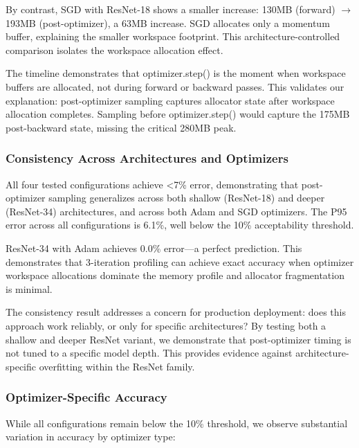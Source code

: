 By contrast, SGD with ResNet-18 shows a smaller increase: 130MB (forward) $\rightarrow$ 193MB (post-optimizer), a 63MB increase. SGD allocates only a momentum buffer, explaining the smaller workspace footprint. This architecture-controlled comparison isolates the workspace allocation effect.

The timeline demonstrates that optimizer.step() is the moment when workspace buffers are allocated, not during forward or backward passes. This validates our explanation: post-optimizer sampling captures allocator state after workspace allocation completes. Sampling before optimizer.step() would capture the 175MB post-backward state, missing the critical 280MB peak.

\subsubsection{Consistency Across Architectures and Optimizers}

All four tested configurations achieve <7\% error, demonstrating that post-optimizer sampling generalizes across both shallow (ResNet-18) and deeper (ResNet-34) architectures, and across both Adam and SGD optimizers. The P95 error across all configurations is 6.1\%, well below the 10\% acceptability threshold.

ResNet-34 with Adam achieves 0.0\% error---a perfect prediction. This demonstrates that 3-iteration profiling can achieve exact accuracy when optimizer workspace allocations dominate the memory profile and allocator fragmentation is minimal.

The consistency result addresses a concern for production deployment: does this approach work reliably, or only for specific architectures? By testing both a shallow and deeper ResNet variant, we demonstrate that post-optimizer timing is not tuned to a specific model depth. This provides evidence against architecture-specific overfitting within the ResNet family.

\subsubsection{Optimizer-Specific Accuracy}

While all configurations remain below the 10\% threshold, we observe substantial variation in accuracy by optimizer type:

\begin{table}[htbp]
\centering
{}
\end{table}

